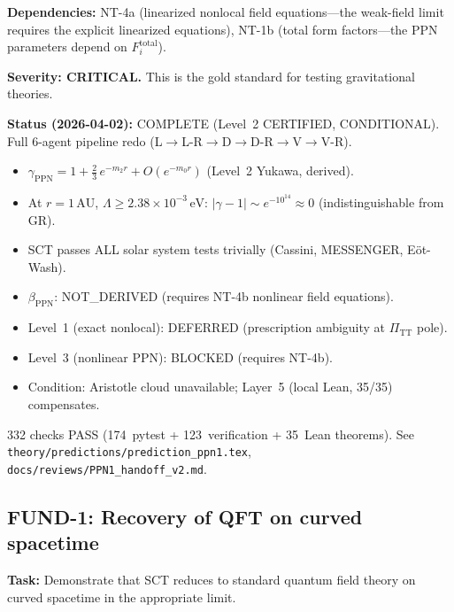 \documentclass[12pt,a4paper]{article}
\newcommand{\task}[1]{\noindent\textbf{Task:} #1\par}
\newcommand{\deps}[1]{\noindent\textbf{Dependencies:} #1\par}
\begin{document}
\deps{NT-4a (linearized nonlocal field equations---the weak-field limit requires
the explicit linearized equations), NT-1b (total form factors---the PPN
parameters depend on $F_i^{\text{total}}$).}

\textbf{Severity: CRITICAL.} This is the gold standard for testing
gravitational theories.

\textbf{Status (2026-04-02):} \textcolor{proven}{COMPLETE (Level~2 CERTIFIED, CONDITIONAL).}
Full 6-agent pipeline redo (L$\to$L-R$\to$D$\to$D-R$\to$V$\to$V-R).
\begin{itemize}
  \item $\gamma_{\text{PPN}} = 1 + \tfrac{2}{3}\,e^{-m_2 r} + O(e^{-m_0 r})$ (Level~2 Yukawa, derived).
  \item At $r = 1\,\text{AU}$, $\Lambda \geq 2.38\times 10^{-3}\,\text{eV}$:
    $|\gamma - 1| \sim e^{-10^{14}} \approx 0$ (indistinguishable from GR).
  \item SCT passes ALL solar system tests trivially (Cassini, MESSENGER, E\"ot-Wash).
  \item $\beta_{\text{PPN}}$: NOT\_DERIVED (requires NT-4b nonlinear field equations).
  \item Level~1 (exact nonlocal): DEFERRED (prescription ambiguity at $\Pi_{\text{TT}}$ pole).
  \item Level~3 (nonlinear PPN): BLOCKED (requires NT-4b).
  \item Condition: Aristotle cloud unavailable; Layer~5 (local Lean, 35/35) compensates.
\end{itemize}
332 checks PASS (174~pytest + 123~verification + 35~Lean theorems).
See \texttt{theory/predictions/prediction\_ppn1.tex},
\texttt{docs/reviews/PPN1\_handoff\_v2.md}.

\subsection{FUND-1: Recovery of QFT on curved spacetime}
\label{task:FUND1}

\task{Demonstrate that SCT reduces to standard quantum field theory on
curved spacetime in the appropriate limit.}
\end{document}
